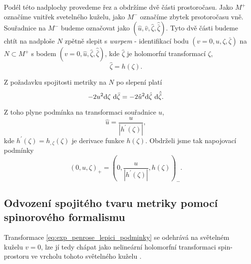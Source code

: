 Podél této nadplochy provedeme řez a obdržíme dvě části prostoročasu. Jako $M^+$ označíme vnitřek
svetelného kuželu, jako $M^-$ označíme zbytek prsotoročasu vně. Souřadnice na $M^-$ budeme označovat jako $(\hat{u}, \hat{v}, \hat{\zeta}, \hat{\bar{\zeta}})$.
Tyto dvě části budeme chtít na nadploše $N$ zpětně slepit s \emph{warpem} - identifikací bodu $(v=0, u, \zeta, \bar{\zeta})$ na $N \subset M^+$
s bodem $(v = 0, \hat{u}, \hat{\zeta}, \hat{\bar{\zeta}})$, kde $\hat{\zeta}$ je holomorfní transformací $\zeta$,
\begin{equation}
    \label{eq:zeta_holomorfni_h}
    \hat{\zeta} = h(\zeta).
\end{equation}

Z požadavku spojitosti metriky na $N$ po slepení platí
\begin{equation}
    -2 u^2 \mathrm{d} \zeta ~ \mathrm{d} \bar{\zeta} = -2 \hat{u}^2 \mathrm{d} \hat{\zeta} ~ \mathrm{d} \hat{\bar{\zeta}}.
\end{equation}

Z toho plyne podmínka na transformaci souřadnice $u$,
\begin{equation}
    \label{eq:u_podminka_spojitosti}
    \hat{u} = \frac{u}{\left| h^{'}(\zeta) \right|},
\end{equation}
kde $h^{'}(\zeta) = h_{,\zeta}(\zeta)$ je derivace funkce $h(\zeta)$.
Obdrželi jsme tak napojovací podmínky
\begin{equation}
    \label{eq:exp_penrose_lepici_podminky}
    (0, u, \zeta)_+ = \left(0, \frac{u}{\left| h^{'}(\zeta)\right|}, h(\zeta)\right)_{-}.
\end{equation}

\subsection{Odvození spojitého tvaru metriky pomocí spinorového formalismu}

Transformace \eqref{eq:exp_penrose_lepici_podminky} se odehrává na světelném kuželu
$v=0$, lze jí tedy chápat jako nelineární holomorfní transformaci spin-prostoru ve vrcholu
tohoto světelného kuželu \cite{PenroseNutku1992}.

